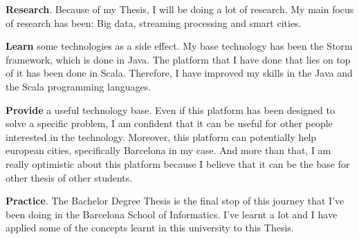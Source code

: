 \mylist
  \item {\bf Research}. Because of my Thesis, I will be doing a lot of
research. My main focus of research has been: Big data, streaming processing and
smart cities.
  \item {\bf Learn} some technologies as a side effect. My base technology has
been the Storm framework, which is done in Java. The platform that I have done
that lies on top of it has been done in Scala. Therefore, I have improved my
skills in the Java and the Scala programming languages.
  \item {\bf Provide} a useful technology base. Even if this platform has
been designed to solve a specific problem, I am confident that it can be
useful for other people interested in the technology. Moreover, this platform
can potentially help european cities, specifically Barcelona in my case. And
more than that, I am really optimistic about this platform because I believe
that it can be the base for other thesis of other students.
  \item {\bf Practice}. The Bachelor Degree Thesis is the final stop of this
journey that I've been doing in the Barcelona School of Informatics. I've
learnt a lot and I have applied some of the concepts learnt in this
university to this Thesis.
\mylistend

